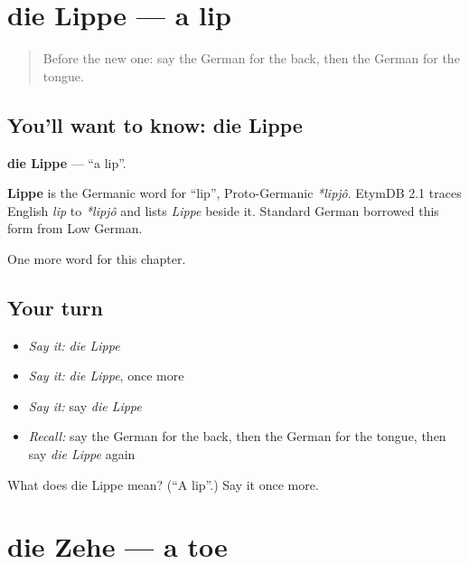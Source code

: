 \section[die Lippe]{die Lippe — a lip}

\label{lesson:GE-C58-lippe}



\begin{quote}
Before the new one: say the German for the back, then the German for the tongue.
\end{quote}

\subsection*{You'll want to know: die Lippe}
\textbf{die Lippe} — \textquotedblleft{}a lip\textquotedblright{}.

\begin{cousinweb}
\textbf{Lippe} is the Germanic word for \textquotedblleft{}lip\textquotedblright{}, Proto-Germanic \emph{*lipjô}. EtymDB 2.1 traces English \emph{lip} to \emph{*lipjô} and lists \emph{Lippe} beside it. Standard German borrowed this form from Low German.
\end{cousinweb}

\begin{grammarlens}[title={What you've built}]
One more word for this chapter.
\end{grammarlens}

\subsection*{Your turn}
\begin{itemize}
\raggedright
  \item \emph{Say it:} \emph{die Lippe}
  \item \emph{Say it:} \emph{die Lippe}, once more
  \item \emph{Say it:} say \emph{die Lippe}
  \item \emph{Recall:} say the German for the back, then the German for the tongue, then say \emph{die Lippe} again
\end{itemize}

\begin{tcolorbox}[breakable,colback=teal!4,colframe=teal!35!black,title={Before you move on}]
What does die Lippe mean? (\textquotedblleft{}A lip\textquotedblright{}.) Say it once more.
\end{tcolorbox}
\section[die Zehe]{die Zehe — a toe}

